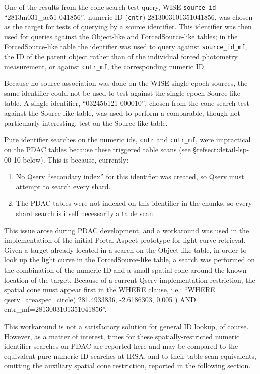 One of the results from the cone search test query, WISE \verb|source_id| ``2813m031\_ac51-041856'',
numeric ID (\verb|cntr|) 2813003101351041856,
was chosen as the target for tests of querying by a source identifier.
This identifier was then used for queries against the Object-like and ForcedSource-like tables;
in the ForcedSource-like table the identifier was used to query against \verb|source_id_mf|,
the ID of the parent object rather than of the individual forced photometry measurement,
or against \verb|cntr_mf|, the corresponding numeric ID.

Because no source association was done on the WISE single-epoch sources,
the same identifier could not be used to test against the single-epoch Source-like table.
A single identifier, ``03245b121-000010'', chosen from the cone search test against the Source-like table,
was used to perform a comparable, though not particularly interesting, test on the Source-like table.

Pure identifier searches on the numeric ids, \verb|cntr| and \verb|cntr_mf|,
were impractical on the PDAC tables because these triggered table scans (see \S ref{sect:detail-lsp-00-10} below).
This is because, currently:

\begin{enumerate}
\item{No Qserv ``secondary index'' for this identifier was created, so Qserv must attempt to search every shard.}
\item{The PDAC tables were not indexed on this identifier in the chunks, so every shard search is itself necessarily a table scan.}
\end{enumerate}

This issue arose during PDAC development,
and a workaround was used in the implementation of the initial Portal Aspect prototype for light curve retrieval.
Given a target already located in a search on the Object-like table,
in order to look up the light curve in the ForcedSource-like table, 
a search was performed on the combination of the numeric ID and a small spatial cone around the known location of the target.
Because of a current Qserv implementation restriction,
the spatial cone must appear first in the WHERE clause, i.e.:
``WHERE qserv\_areaspec\_circle( 281.4933836, -2.6186303, 0.005 ) AND cntr\_mf=2813003101351041856''.

This workaround is not a satisfactory solution for general ID lookup, of course.
However, as a matter of interest,
times for these spatially-restricted numeric identifier searches on PDAC are reported here and may be compared to the equivalent pure numeric-ID searches at IRSA,
and to their table-scan equivalents, omitting the auxiliary spatial cone restriction,
reported in the following section.

